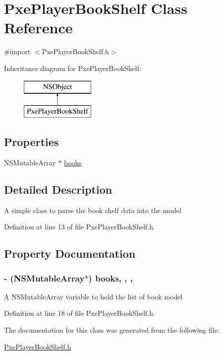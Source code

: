 \hypertarget{interface_pxe_player_book_shelf}{\section{Pxe\-Player\-Book\-Shelf Class Reference}
\label{interface_pxe_player_book_shelf}
}


{\ttfamily \#import $<$Pxe\-Player\-Book\-Shelf.\-h$>$}

Inheritance diagram for Pxe\-Player\-Book\-Shelf\-:\begin{figure}[H]
\begin{center}
\leavevmode
\includegraphics[height=2.000000cm]{interface_pxe_player_book_shelf}
\end{center}
\end{figure}
\subsection*{Properties}
\begin{DoxyCompactItemize}
\item 
N\-S\-Mutable\-Array $\ast$ \hyperlink{interface_pxe_player_book_shelf_acda2f34c3ec62d2da9a6e0d388fb8db6}{books}
\end{DoxyCompactItemize}


\subsection{Detailed Description}
A simple class to parse the book shelf data into the model 

Definition at line 13 of file Pxe\-Player\-Book\-Shelf.\-h.



\subsection{Property Documentation}
\hypertarget{interface_pxe_player_book_shelf_acda2f34c3ec62d2da9a6e0d388fb8db6}{
\subsubsection[{books}]{\setlength{\rightskip}{0pt plus 5cm}-\/ (N\-S\-Mutable\-Array$\ast$) books\hspace{0.3cm}{\ttfamily [read]}, {\ttfamily [write]}, {\ttfamily [nonatomic]}, {\ttfamily [strong]}}}\label{interface_pxe_player_book_shelf_acda2f34c3ec62d2da9a6e0d388fb8db6}
A N\-S\-Mutable\-Array variable to hold the list of book model 

Definition at line 18 of file Pxe\-Player\-Book\-Shelf.\-h.



The documentation for this class was generated from the following file\-:\begin{DoxyCompactItemize}
\item 
\hyperlink{_pxe_player_book_shelf_8h}{Pxe\-Player\-Book\-Shelf.\-h}\end{DoxyCompactItemize}
